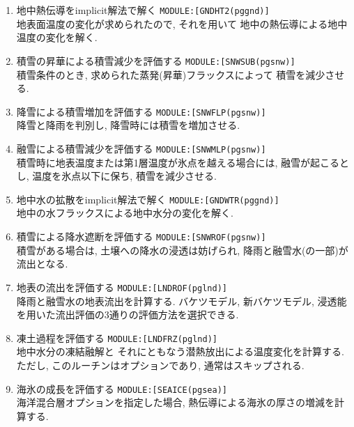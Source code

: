 \begin{enumerate}
  \item 地中熱伝導をimplicit解法で解く \texttt{MODULE:[GNDHT2(pggnd)]} \\
            地表面温度の変化が求められたので, それを用いて
            地中の熱伝導による地中温度の変化を解く.

  \item 積雪の昇華による積雪減少を評価する \texttt{MODULE:[SNWSUB(pgsnw)]} \\
            積雪条件のとき, 求められた蒸発(昇華)フラックスによって
            積雪を減少させる.

  \item 降雪による積雪増加を評価する \texttt{MODULE:[SNWFLP(pgsnw)]} \\
            降雪と降雨を判別し, 降雪時には積雪を増加させる.

  \item 融雪による積雪減少を評価する \texttt{MODULE:[SNWMLP(pgsnw)]} \\
            積雪時に地表温度または第1層温度が氷点を越える場合には,
            融雪が起こるとし, 温度を氷点以下に保ち,
            積雪を減少させる. 

  \item 地中水の拡散をimplicit解法で解く \texttt{MODULE:[GNDWTR(pggnd)]} \\
            地中の水フラックスによる地中水分の変化を解く.
            
  \item 積雪による降水遮断を評価する \texttt{MODULE:[SNWROF(pgsnw)]} \\
            積雪がある場合は, 土壌への降水の浸透は妨げられ,
            降雨と融雪水(の一部)が流出となる. 

  \item 地表の流出を評価する \texttt{MODULE:[LNDROF(pglnd)]} \\
            降雨と融雪水の地表流出を計算する.
            バケツモデル, 新バケツモデル,
            浸透能を用いた流出評価の3通りの評価方法を選択できる.

  \item 凍土過程を評価する \texttt{MODULE:[LNDFRZ(pglnd)]} \\
            地中水分の凍結融解と
            それにともなう潜熱放出による温度変化を計算する.
            ただし, このルーチンはオプションであり, 
            通常はスキップされる.

  \item 海氷の成長を評価する \texttt{MODULE:[SEAICE(pgsea)]} \\
            海洋混合層オプションを指定した場合,
            熱伝導による海氷の厚さの増減を計算する.


\end{enumerate}
